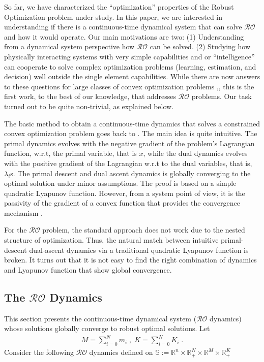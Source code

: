 \documentclass[journal,twoside,web]{ieeecolor}
\newcommand{\rev}[1]{\textcolor{revisionblue}{#1}}
\begin{document}
So far, we have characterized the ``optimization'' properties of the Robust Optimization problem under study. In this paper, we are interested in understanding if there is a continuous-time dynamical system that can solve $\mathcal{RO}$ and how it would operate. Our main motivations are two: (1) Understanding from a dynamical system perspective how $\mathcal{RO}$ can be solved. (2) Studying how physically interacting systems with very simple capabilities and or ``intelligence'' can cooperate to solve complex optimization problems (learning, estimation, and decision) well outside the single element capabilities. While there are now answers to these questions for large classes of convex optimization problems \cite{feijer2010},\cite{wang2011}, this is the first work, to the best of our knowledge, that addresses $\mathcal{RO}$ problems. Our task turned out to be quite non-trivial, as explained below.

The basic method to obtain a continuous-time dynamics that solves a constrained convex optimization problem goes back to \cite{arrow1958}. The main idea is quite intuitive. The primal dynamics evolves with the negative gradient of the problem's Lagrangian function, w.r.t, the primal variable, that is $x$, while the dual dynamics evolves with the positive gradient of the Lagrangian w.r.t to the dual variables, that is, $\lambda_i$s. The primal descent and dual ascent dynamics is globally converging to the optimal solution under minor assumptions. The proof is based on a simple quadratic Lyapunov function. However, from a system point of view, it is the passivity of the gradient of a convex function that provides the convergence mechanism \cite{simpson2016,kosaraju2018}.

For the $\mathcal{RO}$ problem, the standard approach does not work due to the nested structure of optimization. Thus, the natural match between intuitive primal-descent dual-ascent dynamics via a traditional quadratic Lyapunov function is broken. It turns out that it is not easy to find the right combination of dynamics and Lyapunov function that show global convergence.

\subsection*{\rev{The $\mathcal{RO}$ Dynamics}}

\rev{This section presents the continuous-time dynamical system ($\mathcal{RO}$ dynamics) whose solutions globally converge to robust optimal solutions.} Let
\begin{align*}
M=\sum_{i=0}^{N}m_i\;,\; K=\sum_{i=0}^{N}K_i\;.
\end{align*}
\rev{Consider the following $\mathcal{RO}$ dynamics defined on $\mathbb{S}:= \mathbb{R}^n \times \mathbb{R}^N_{+} \times \mathbb{R}^M \times \mathbb{R}^K_+$}\;
\end{document}
